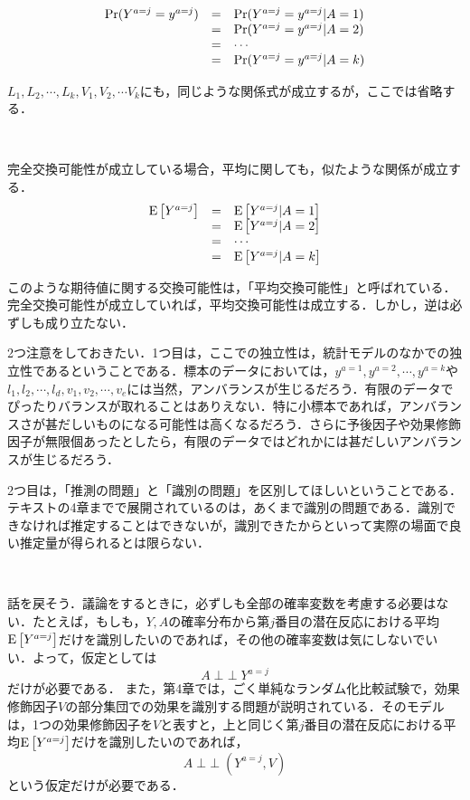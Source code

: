 \documentclass[12pt]{jsarticle}
\newcommand{\indep}{\mathop{\perp\!\!\!\perp}}
\begin{document}
\[
\begin{array}{lll}
{\rm Pr}(Y^{a=j}=y^{a=j}) &=  &{\rm Pr}(Y^{a=j}=y^{a=j}|A = 1)  \\
  & = & {\rm Pr}(Y^{a=j}=y^{a=j}|A = 2) \\
   & = & \cdots  \\
   & = & {\rm Pr}(Y^{a=j}=y^{a=j}|A = k)
\end{array}
\]

$L_1, L_2, \cdots, L_k, V_1, V_2, \cdots V_k$にも，同じような関係式が成立するが，ここでは省略する．

\

完全交換可能性が成立している場合，平均に関しても，似たような関係が成立する．
\[
\begin{array}{lll}
{\rm E}\left[Y^{a=j}\right] &=  &{\rm E}\left[Y^{a=j}|A = 1\right]  \\
  & = & {\rm E}\left[Y^{a=j}|A = 2\right] \\
   & = & \cdots  \\
   & = & {\rm E}\left[Y^{a=j}|A = k\right]
\end{array}
\]


このような期待値に関する交換可能性は，「平均交換可能性」と呼ばれている．完全交換可能性が成立していれば，平均交換可能性は成立する．しかし，逆は必ずしも成り立たない．



2つ注意をしておきたい．1つ目は，ここでの独立性は，統計モデルのなかでの独立性であるということである．標本のデータにおいては，$y^{a=1}, y^{a=2}, \cdots, y^{a=k}$や$l_1, l_2, \cdots, l_d, v_1, v_2, \cdots, v_e$には当然，アンバランスが生じるだろう．有限のデータでぴったりバランスが取れることはありえない．特に小標本であれば，アンバランスさが甚だしいものになる可能性は高くなるだろう．さらに予後因子や効果修飾因子が無限個あったとしたら，有限のデータではどれかには甚だしいアンバランスが生じるだろう．

2つ目は，「推測の問題」と「識別の問題」を区別してほしいということである．テキストの4章までで展開されているのは，あくまで識別の問題である．識別できなければ推定することはできないが，識別できたからといって実際の場面で良い推定量が得られるとは限らない．

\

話を戻そう．議論をするときに，必ずしも全部の確率変数を考慮する必要はない．たとえば，もしも，$Y,A$の確率分布から第$j$番目の潜在反応における平均${\rm E}\left[Y^{a=j}\right]$だけを識別したいのであれば，その他の確率変数は気にしないでいい．よって，仮定としては
\[
A \indep Y^{a=j}
\]
だけが必要である．
また，第4章では，ごく単純なランダム化比較試験で，効果修飾因子$V$の部分集団での効果を識別する問題が説明されている．そのモデルは，1つの効果修飾因子を$V$と表すと，上と同じく第$j$番目の潜在反応における平均${\rm E}\left[Y^{a=j}\right]$だけを識別したいのであれば，
\[
A \indep (Y^{a=j}, V)
\]
という仮定だけが必要である．
\end{document}
